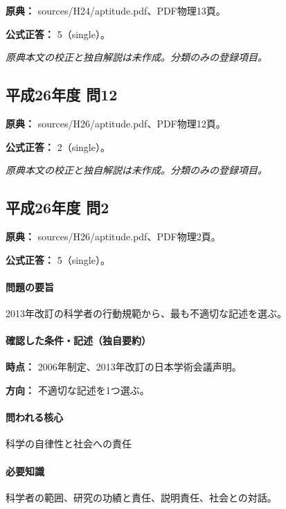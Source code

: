 \noindent\textbf{原典：} sources/H24/aptitude.pdf、PDF物理13頁。

\textbf{公式正答：} 5（single）。

\par\textit{原典本文の校正と独自解説は未作成。分類のみの登録項目。}

\subsection{平成26年度 問12}
\label{q:h26-reg-apt-12}

\noindent\textbf{原典：} sources/H26/aptitude.pdf、PDF物理12頁。

\textbf{公式正答：} 2（single）。

\par\textit{原典本文の校正と独自解説は未作成。分類のみの登録項目。}

\subsection{平成26年度 問2}
\label{q:h26-reg-apt-02}

\noindent\textbf{原典：} sources/H26/aptitude.pdf、PDF物理2頁。

\textbf{公式正答：} 5（single）。

\paragraph{問題の要旨} 2013年改訂の科学者の行動規範から、最も不適切な記述を選ぶ。

\paragraph{確認した条件・記述（独自要約）}\mbox{}\par

\noindent\textbf{時点：} 2006年制定、2013年改訂の日本学術会議声明。\par

\noindent\textbf{方向：} 不適切な記述を1つ選ぶ。\par

\paragraph{問われる核心} 科学の自律性と社会への責任

\paragraph{必要知識} 科学者の範囲、研究の功績と責任、説明責任、社会との対話。

